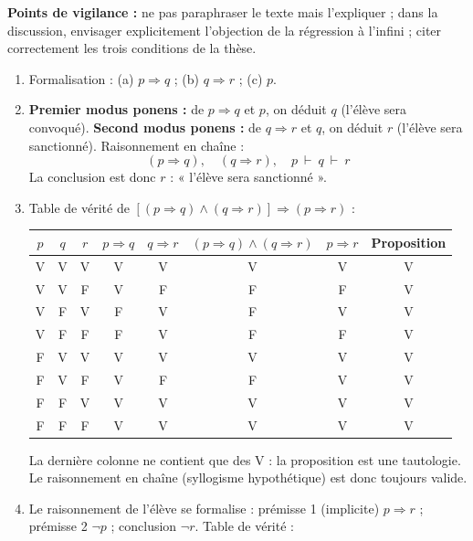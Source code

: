 \documentclass[11pt]{article}
\newcommand{\cle}[1]{{\popxbold\color{popdark}#1}}
\begin{document}
\begin{corrige}
\begin{enumerate}
\end{enumerate}
\textbf{Points de vigilance :} ne pas paraphraser le texte mais l'expliquer ; dans la discussion, envisager explicitement l'objection de la régression à l'infini ; citer correctement les trois conditions de la thèse.
\end{corrige}

\begin{corrige}
\begin{enumerate}
\item Formalisation : (a) $p \Rightarrow q$ ; (b) $q \Rightarrow r$ ; (c) $p$.
\item \textbf{Premier modus ponens :} de $p \Rightarrow q$ et $p$, on déduit $q$ (l'élève sera convoqué). \textbf{Second modus ponens :} de $q \Rightarrow r$ et $q$, on déduit $r$ (l'élève sera sanctionné). Raisonnement en chaîne :
\[ (p \Rightarrow q),\quad (q \Rightarrow r),\quad p \ \vdash\ q \ \vdash\ r \]
La conclusion est donc $r$ : « l'élève sera sanctionné ».
\item Table de vérité de $[(p \Rightarrow q) \wedge (q \Rightarrow r)] \Rightarrow (p \Rightarrow r)$ :
\begin{center}
\begin{tabular}{|c|c|c|c|c|c|c|c|}
\hline
\rowcolor{popblueL} $p$ & $q$ & $r$ & $p{\Rightarrow}q$ & $q{\Rightarrow}r$ & $(p{\Rightarrow}q)\wedge(q{\Rightarrow}r)$ & $p{\Rightarrow}r$ & Proposition \\
\hline
V & V & V & V & V & V & V & V \\
\hline
V & V & F & V & F & F & F & V \\
\hline
V & F & V & F & V & F & V & V \\
\hline
V & F & F & F & V & F & F & V \\
\hline
F & V & V & V & V & V & V & V \\
\hline
F & V & F & V & F & F & V & V \\
\hline
F & F & V & V & V & V & V & V \\
\hline
F & F & F & V & V & V & V & V \\
\hline
\end{tabular}
\end{center}
La dernière colonne ne contient que des V : la proposition est une \cle{tautologie}. Le raisonnement en chaîne (syllogisme hypothétique) est donc toujours valide.
\item Le raisonnement de l'élève se formalise : prémisse 1 (implicite) $p \Rightarrow r$ ; prémisse 2 $\neg p$ ; conclusion $\neg r$. Table de vérité :

\end{enumerate}
\end{corrige}
\end{document}
